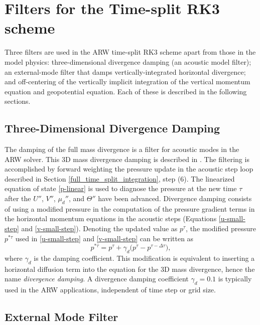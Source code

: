 %
%

\section{Filters for the Time-split RK3 scheme}

Three filters are used in the ARW time-split RK3
scheme apart from those in the model physics: three-dimensional
divergence damping (an acoustic model filter); an external-mode filter
that damps vertically-integrated horizontal divergence; and off-centering
of the vertically implicit integration of the vertical momentum
equation and geopotential equation.  Each of these is described in the
following sections.

\subsection{Three-Dimensional Divergence Damping}

The damping of the full mass divergence is a filter for acoustic
modes in the ARW solver.  This 3D mass divergence damping is described
in \citet{skamarock92}.  The filtering is accomplished by
forward weighting the pressure update in the acoustic step loop
described in Section \ref{full_time_split_integration}, step (6).  The linearized equation of
state \eqref{p-linear} is used to diagnose the pressure at the new time $\tau$
after the $U''$, $V''$, $\mu_d''$, and $\Theta''$ have
been advanced.  Divergence damping consists of using a modified pressure
in the computation of the pressure gradient terms in the horizontal
momentum equations in the acoustic steps (Equations \eqref{u-small-step}
and \eqref{v-small-step}).  Denoting the updated value as $p^\tau$, 
the modified pressure $p^{*\tau}$ used in \eqref{u-small-step}
and \eqref{v-small-step}
can be written as
%
\begin{equation}
p^{*\tau} = 
{p}^{\tau} + \gamma_d \bigl(
{p}^{\tau} -
{p}^{\tau - \Delta \tau}
\bigr),
\end{equation}
%
\noindent
where $\gamma_d$ is the damping coefficient.  
This modification is equivalent to inserting a horizontal 
diffusion term into the equation for the 3D mass divergence,
hence the name {\em divergence damping}.
A divergence damping coefficient $\gamma_d = 0.1$ is
typically used in the ARW
applications, independent of time step or grid size.

\subsection{External Mode Filter}

